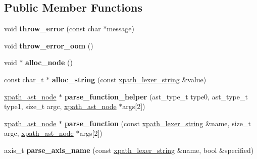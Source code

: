 \subsection*{Public Member Functions}
\begin{DoxyCompactItemize}
\item 
\hypertarget{structxpath__parser_a043353db574741cd4f460a042a0b22c6}{void {\bfseries throw\+\_\+error} (const char $\ast$message)}\label{structxpath__parser_a043353db574741cd4f460a042a0b22c6}

\item 
\hypertarget{structxpath__parser_aeb5c7d7a6f8c5705a769297f42960c3e}{void {\bfseries throw\+\_\+error\+\_\+oom} ()}\label{structxpath__parser_aeb5c7d7a6f8c5705a769297f42960c3e}

\item 
\hypertarget{structxpath__parser_ae33adcc8eb125124967d95297daff351}{void $\ast$ {\bfseries alloc\+\_\+node} ()}\label{structxpath__parser_ae33adcc8eb125124967d95297daff351}

\item 
\hypertarget{structxpath__parser_a109e4c472bb76911a2b49ee741d400af}{const char\+\_\+t $\ast$ {\bfseries alloc\+\_\+string} (const \hyperlink{structxpath__lexer__string}{xpath\+\_\+lexer\+\_\+string} \&value)}\label{structxpath__parser_a109e4c472bb76911a2b49ee741d400af}

\item 
\hypertarget{structxpath__parser_a21a1a2579c610e0ebd76247b9d325bb1}{\hyperlink{classxpath__ast__node}{xpath\+\_\+ast\+\_\+node} $\ast$ {\bfseries parse\+\_\+function\+\_\+helper} (ast\+\_\+type\+\_\+t type0, ast\+\_\+type\+\_\+t type1, size\+\_\+t argc, \hyperlink{classxpath__ast__node}{xpath\+\_\+ast\+\_\+node} $\ast$args\mbox{[}2\mbox{]})}\label{structxpath__parser_a21a1a2579c610e0ebd76247b9d325bb1}

\item 
\hypertarget{structxpath__parser_a7acb32147ef3aac058f94257b57ff14f}{\hyperlink{classxpath__ast__node}{xpath\+\_\+ast\+\_\+node} $\ast$ {\bfseries parse\+\_\+function} (const \hyperlink{structxpath__lexer__string}{xpath\+\_\+lexer\+\_\+string} \&name, size\+\_\+t argc, \hyperlink{classxpath__ast__node}{xpath\+\_\+ast\+\_\+node} $\ast$args\mbox{[}2\mbox{]})}\label{structxpath__parser_a7acb32147ef3aac058f94257b57ff14f}

\item 
\hypertarget{structxpath__parser_ad67ec26e0e286ca1bb5144a79e3a3583}{axis\+\_\+t {\bfseries parse\+\_\+axis\+\_\+name} (const \hyperlink{structxpath__lexer__string}{xpath\+\_\+lexer\+\_\+string} \&name, bool \&specified)}\label{structxpath__parser_ad67ec26e0e286ca1bb5144a79e3a3583}


\end{DoxyCompactItemize}
